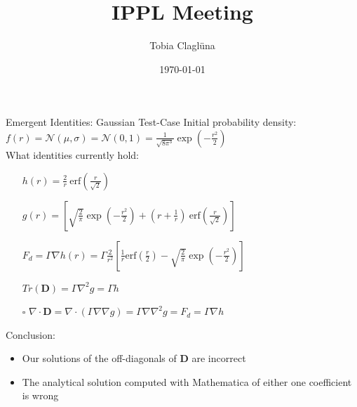 

\title[\today]{IPPL Meeting}

\author{Tobia Claglüna}
\date{\today}
\def \myEmail {tobia.clagluena@psi.ch}





\begin{frame}[c]{Emergent Identities: Gaussian Test-Case}
    Initial probability density: $f(r) = \mathcal N(\mu, \sigma) = \mathcal N(0, 1) = \frac{1}{\sqrt{8 \pi^3}} \exp{(-\frac{r^2}{2})}$ \\
    What identities currently hold:
    \begin{itemize}
        \item[\done] $h(r) = \frac{2}{r}\ \text{erf} (\frac{r}{\sqrt{2}})$
        \item[\done] $g(r) =  \left [ \sqrt{\frac{2}{\pi}} \exp{(-\frac{r^2}{2})} +  (r + \frac{1}{r})\ \text{erf}(\frac{r}{\sqrt{2}})\right]$
        \item[\done] $F_d = \Gamma \nabla h(r) = \Gamma \frac{2}{r^2} \left[ \frac{1}{r} \text{erf}({\frac{r}{2}}) - \sqrt{\frac{2}{\pi}} \exp{(- \frac{r^2}{2})}  \right]$
        \item[\done] $Tr(\boldsymbol D) = \Gamma \nabla^2 g = \Gamma h$
        \item[$\square$] $\nabla \cdot \boldsymbol D = \nabla \cdot (\Gamma \nabla \nabla g) = \Gamma \nabla \nabla^2 g = F_d = \Gamma \nabla h$
    \end{itemize}

    Conclusion: 
    \begin{itemize}
        \item Our solutions of the off-diagonals of $\boldsymbol D$ are incorrect 
        \item The analytical solution computed with Mathematica of either one coefficient is wrong
    \end{itemize}
\end{frame}

